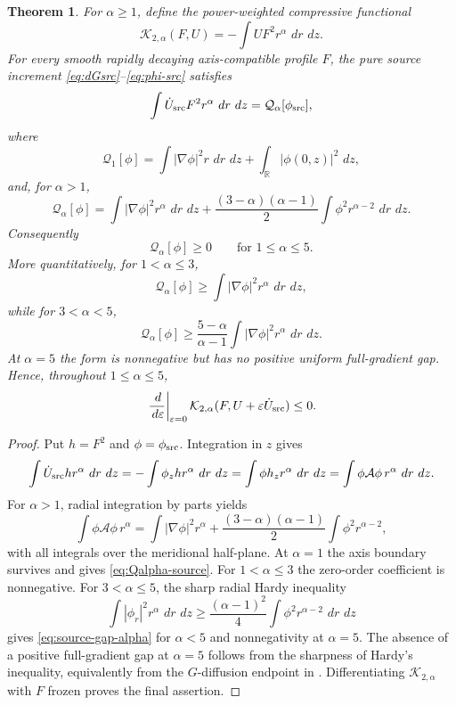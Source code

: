 \documentclass[11pt]{article}
\numberwithin{equation}{section}
\newtheorem{theorem}{Theorem}[section]
\theoremstyle{definition}
\newcommand{\R}{\mathbb R}
\newcommand{\dd}{\,d}
\begin{document}
\begin{theorem}\label{thm:weighted-antisource}
For $\alpha\ge1$, define the power-weighted compressive functional
\[
 \mathcal K_{2,\alpha}(F,U)
 =-\int UF^2r^\alpha\,\dd r\,\dd z.
\]
For every smooth rapidly decaying axis-compatible profile $F$, the pure source increment \eqref{eq:dGsrc}--\eqref{eq:phi-src} satisfies
\begin{equation}\label{eq:weighted-source-response}
 \int \dot U_{\rm src}F^2r^\alpha\,\dd r\,\dd z
 =\mathcal Q_\alpha[\phi_{\rm src}],
\end{equation}
where
\begin{equation}\label{eq:Qalpha-source}
 \mathcal Q_1[\phi]
 =\int|\nabla\phi|^2r\,\dd r\,\dd z
 +\int_\R|\phi(0,z)|^2\,\dd z,
\end{equation}
and, for $\alpha>1$,
\begin{equation}\label{eq:Qalpha-source2}
 \mathcal Q_\alpha[\phi]
 =\int|\nabla\phi|^2r^\alpha\,\dd r\,\dd z
 +\frac{(3-\alpha)(\alpha-1)}2
  \int \phi^2r^{\alpha-2}\,\dd r\,\dd z.
\end{equation}
Consequently
\[
 \mathcal Q_\alpha[\phi]\ge0
 \qquad\text{for }1\le\alpha\le5.
\]
More quantitatively, for $1<\alpha\le3$,
\[
 \mathcal Q_\alpha[\phi]\ge
 \int|\nabla\phi|^2r^\alpha\,\dd r\,\dd z,
\]
while for $3<\alpha<5$,
\begin{equation}\label{eq:source-gap-alpha}
 \mathcal Q_\alpha[\phi]\ge
 \frac{5-\alpha}{\alpha-1}
 \int|\nabla\phi|^2r^\alpha\,\dd r\,\dd z.
\end{equation}
At $\alpha=5$ the form is nonnegative but has no positive uniform full-gradient gap.  Hence, throughout $1\le\alpha\le5$,
\[
 \left.\frac{\dd}{\dd\varepsilon}\right|_{\varepsilon=0}
 \mathcal K_{2,\alpha}(F,U+\varepsilon\dot U_{\rm src})\le0.
\]
\end{theorem}

\begin{proof}
Put $h=F^2$ and $\phi=\phi_{\rm src}$.  Integration in $z$ gives
\[
 \int \dot U_{\rm src}h r^\alpha\,\dd r\,\dd z
 =-\int\phi_z h r^\alpha\,\dd r\,\dd z
 =\int\phi h_z r^\alpha\,\dd r\,\dd z
 =\int\phi\mathcal A\phi\,r^\alpha\,\dd r\,\dd z.
\]
For $\alpha>1$, radial integration by parts yields
\[
 \int\phi\mathcal A\phi\,r^\alpha
 =\int|\nabla\phi|^2r^\alpha
 +\frac{(3-\alpha)(\alpha-1)}2\int\phi^2r^{\alpha-2},
\]
with all integrals over the meridional half-plane.  At $\alpha=1$ the axis boundary survives and gives \eqref{eq:Qalpha-source}.  For $1<\alpha\le3$ the zero-order coefficient is nonnegative.  For $3<\alpha\le5$, the sharp radial Hardy inequality
\[
 \int|\phi_r|^2r^\alpha\,\dd r\,\dd z
 \ge\frac{(\alpha-1)^2}{4}
 \int\phi^2r^{\alpha-2}\,\dd r\,\dd z
\]
gives \eqref{eq:source-gap-alpha} for $\alpha<5$ and nonnegativity at $\alpha=5$.  The absence of a positive full-gradient gap at $\alpha=5$ follows from the sharpness of Hardy's inequality, equivalently from the $G$-diffusion endpoint in \cite{ShahmurovHardy2026}.  Differentiating $\mathcal K_{2,\alpha}$ with $F$ frozen proves the final assertion.
\end{proof}
\end{document}
